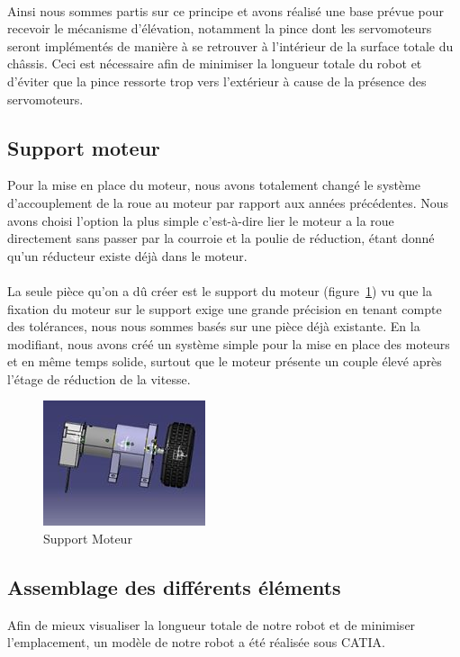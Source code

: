 \paragraph{}
Ainsi nous sommes partis sur ce principe et avons réalisé une base prévue pour recevoir le mécanisme d'élévation, notamment la pince dont les servomoteurs seront implémentés de manière à se retrouver à l'intérieur de la surface totale du châssis. Ceci est nécessaire afin de minimiser la longueur totale du robot et d'éviter que la pince ressorte trop vers l'extérieur à cause de la présence des servomoteurs.

\subsection{Support moteur}
Pour la mise en place du moteur, nous avons totalement changé le système d'accouplement de la roue au moteur par rapport aux années précédentes. Nous avons choisi l'option la plus simple c'est-à-dire lier le moteur a la roue directement sans passer par la courroie et la poulie de réduction, étant donné qu'un réducteur existe déjà dans le moteur.

\paragraph{}
La seule pièce qu'on a dû créer est le support du moteur (figure~\ref{fig:support}) vu que la fixation du moteur sur le support exige une grande précision en tenant compte des tolérances, nous nous sommes basés  sur une pièce déjà existante. En la modifiant, nous avons créé un système simple pour la mise en place des moteurs et en même temps solide, surtout que le moteur présente un couple élevé après l'étage de réduction de la vitesse.

\begin{figure}[!ht]
	\centering
		\includegraphics{support.jpg}
	\caption{Support Moteur}
	\label{fig:support}
\end{figure}

\subsection{Assemblage des différents éléments}
Afin de mieux visualiser la longueur totale de notre robot et de minimiser l'emplacement, un modèle de notre robot a été réalisée sous CATIA.

